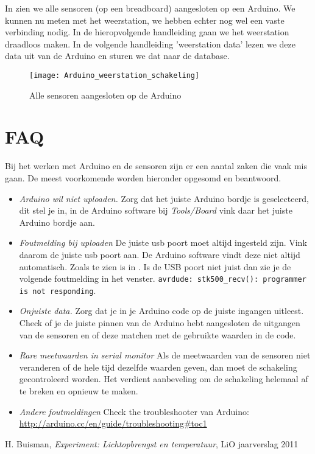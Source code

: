 In  zien we alle sensoren (op
een breadboard) aangesloten op een Arduino. We kunnen nu meten met het weerstation,
we hebben echter nog wel een vaste verbinding nodig. In de hieropvolgende
handleiding gaan we het weerstation draadloos maken.
In de volgende handleiding 'weerstation data' lezen we deze data uit van
de Arduino en sturen we dat naar de \hisparc database.


\begin{figure}
    \centering
    \texttt{[image: Arduino\_weerstation\_schakeling]}
    \caption{Alle sensoren aangesloten op de Arduino}
   \label{fig:Arduino_weerstation_schakeling}
\end{figure}


\section{FAQ}

Bij het werken met Arduino en de sensoren zijn er een aantal zaken die vaak mis
gaan. De meest voorkomende worden hieronder opgesomd en beantwoord.

\begin{itemize}
    \item \emph{Arduino wil niet uploaden.} Zorg dat het
    juiste Arduino bordje is geselecteerd, dit stel je in, in de Arduino
    software bij \emph{Tools/Board} vink daar het juiste Arduino bordje aan.
    \item \emph{Foutmelding bij uploaden} De juiste usb poort moet altijd
    ingesteld zijn. Vink daarom de juiste usb poort aan. De Arduino software
    vindt deze niet altijd automatisch. Zoals te zien is in
    . Is de USB poort niet juist dan zie je de
    volgende foutmelding in het venster.
    \verb|avrdude: stk500_recv(): programmer is not responding|.
    \item \emph{Onjuiste data.} Zorg dat je in je Arduino code op de juiste
    ingangen uitleest. Check of je de juiste pinnen van de Arduino hebt aangesloten
    de uitgangen van de sensoren en of deze matchen met de gebruikte waarden in de
    code.
    \item \emph{Rare meetwaarden in serial
    monitor} Als de meetwaarden van de sensoren niet veranderen of de hele
    tijd dezelfde waarden geven, dan moet de schakeling gecontroleerd
    worden. Het verdient aanbeveling om de schakeling helemaal af te breken
    en opnieuw te maken.
    \item \emph{Andere foutmeldingen} Check the troubleshooter van Arduino:
    \url{http://arduino.cc/en/guide/troubleshooting#toc1}
\end{itemize}

\begin{thebibliography}{9}
        H. Buisman, \emph{\hisparc Experiment: Lichtopbrengst en temperatuur},
        LiO jaarverslag 2011
\end{thebibliography}



